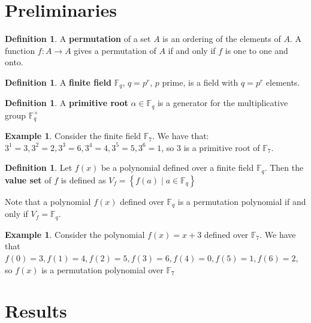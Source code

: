 \documentclass{article}
\theoremstyle{definition}
\newtheorem{definition}[theorem]{Definition}
\newtheorem{example}[theorem]{Example}
\theoremstyle{remark}
\numberwithin{equation}{section}
\begin{document}
\section{Preliminaries}

\begin{definition}
  A \textbf{permutation} of a set $A$ is an ordering of the elements of $A$. A function $f: A \rightarrow A$ gives a permutation of $A$ if and only if $f$ is one to one and onto.
\end{definition}



\begin{definition}
  A \textbf{finite field} $\mathbb{F}_{q}$, $q=p^r$, $p$ prime, is a field with $q=p^r$ elements.
\end{definition}



\begin{definition}
  A \textbf{primitive root} $\alpha \in \mathbb{F}_q$ is a generator for the multiplicative group $\mathbb{F}_{q}^{\times}$
\end{definition}

\begin{example}
  Consider the finite field $\mathbb{F}_{7}$. We have that: $3^1 = 3, 3^2 = 2, 3^3 = 6, 3^4 = 4, 3^5 = 5, 3^6 = 1$, so $3$ is a primitive root of $\mathbb{F}_{7}$.
\end{example}


\begin{definition}
  Let $f(x)$ be a polynomial defined over a finite field $\mathbb{F}_{q}$. Then the \textbf{value set} of $f$ is defined as $V_{f} = \left\{f(a) \mid a \in \mathbb{F}_{q} \right\}$
\end{definition}

Note that a polynomial $f(x)$ defined over $\mathbb{F}_{q}$ is a permutation polynomial if and only if  $V_{f} = \mathbb{F}_{q}$.


\begin{example}
  Consider the polynomial $f(x) = x+3$ defined over $\mathbb{F}_{7}$. We have that $f(0) = 3, f(1) = 4, f(2) = 5, f(3) = 6, f(4) = 0, f(5) = 1, f(6) = 2$, so $f(x)$ is a permutation polynomial over $\mathbb{F}_{7}$
\end{example}


\section{Results}
\end{document}
